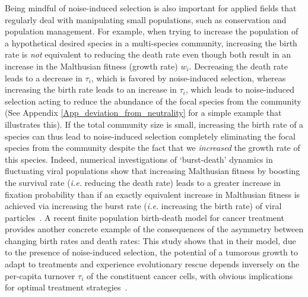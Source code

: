 Being mindful of noise-induced selection is also important for applied fields that regularly deal with manipulating small populations, such as conservation and population management. For example, when trying to increase the population of a hypothetical desired species in a multi-species community, increasing the birth rate is \emph{not} equivalent to reducing the death rate even though both result in an increase in the Malthusian fitness (growth rate) $w_i$. Decreasing the death rate leads to a decrease in $\tau_i$, which is favored by noise-induced selection, whereas increasing the birth rate leads to an increase in $\tau_i$, which leads to noise-induced selection acting to reduce the abundance of the focal species from the community (See Appendix \ref{App_deviation_from_neutrality} for a simple example that illustrates this). If the total community size is small, increasing the birth rate of a species can thus lead to noise-induced selection completely eliminating the focal species from the community despite the fact that we \emph{increased} the growth rate of this species. Indeed, numerical investigations of `burst-death' dynamics in fluctuating viral populations show that increasing Malthusian fitness by boosting the survival rate (\emph{i.e.} reducing the death rate) leads to a greater increase in fixation probability than if an exactly equivalent increase in Malthusian fitness is achieved via increasing the burst rate (\emph{i.e.} increasing the birth rate) of viral particles~\citep{alexander_fixation_2008}.  A recent finite population birth-death model for cancer treatment provides another concrete example of the consequences of the asymmetry between changing birth rates and death rates: This study shows that in their model, due to the presence of noise-induced selection, the potential of a tumorous growth to adapt to treatments and experience evolutionary rescue depends inversely on the per-capita turnover $\tau_i$ of the constituent cancer cells, with obvious implications for optimal treatment strategies~\citep{raatz_promoting_2023}.

